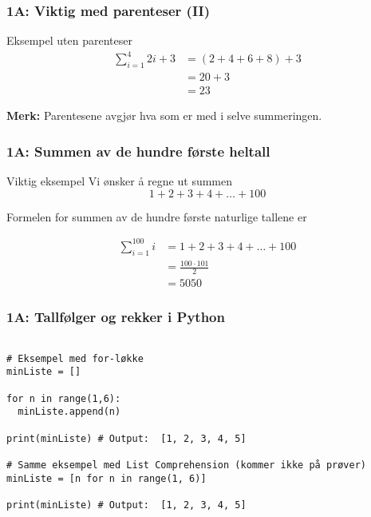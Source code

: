 \blueheader
\begin{frame}
\frametitle{1A: Viktig med parenteser (II)}

\begin{green*}{Eksempel uten parenteser}
\begin{align*}
\sum_{i=1}^{4} 2i+3 
&= (2+4+6+8) + 3 \\
&= 20 + 3 \\
&= 23
\end{align*}

\medskip
\textbf{Merk:} Parentesene avgjør hva som er med i selve summeringen.
\end{green*}

\end{frame}
\begin{frame}
\frametitle{1A: Summen av de hundre første heltall}

\begin{red*}{Viktig eksempel}
Vi ønsker å regne ut summen
\begin{equation*}
1 + 2 + 3 + 4 + \ldots + 100
\end{equation*}

Formelen for summen av de hundre første naturlige tallene er

\begin{align*}
\sum_{i=1}^{100} i 
&= 1 + 2 + 3 + 4 + \ldots + 100 \\
&= \frac{100 \cdot 101}{2} \\
&= 5050
\end{align*}
\end{red*}
\end{frame}

\greenheader
\begin{frame}[fragile]
\frametitle{1A: Tallfølger og rekker i Python} 
\begin{verbatim}

# Eksempel med for-løkke
minListe = []

for n in range(1,6):
  minListe.append(n)
  
print(minListe) # Output:  [1, 2, 3, 4, 5]

# Samme eksempel med List Comprehension (kommer ikke på prøver)
minListe = [n for n in range(1, 6)]   

print(minListe) # Output:  [1, 2, 3, 4, 5]
\end{verbatim}
\end{frame}

